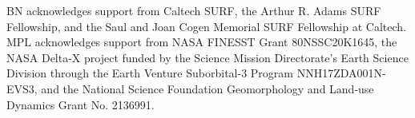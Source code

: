 \documentclass{agujournal2019}
\begin{document}
\acknowledgments
BN acknowledges support from Caltech SURF, the Arthur R. Adams SURF Fellowship, and the Saul and Joan Cogen Memorial SURF Fellowship at Caltech. MPL acknowledges support from NASA FINESST Grant 80NSSC20K1645, the NASA Delta-X project funded by the Science Mission Directorate's Earth Science Division through the Earth Venture Suborbital-3 Program NNH17ZDA001N-EVS3, and the National Science Foundation Geomorphology and Land-use Dynamics Grant No. 2136991.

%
%






%
%
%
%
%
\end{document}
